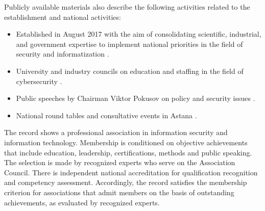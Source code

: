 Publicly available materials also describe the following activities related to the establishment and national activities:

\vspace{-0.5\baselineskip}
\begin{itemize}[nosep]
\item Established in August 2017 with the aim of consolidating scientific, industrial, and government expertise to implement national priorities in the field of security and informatization .
\item University and industry councils on education and staffing in the field of cybersecurity .
\item Public speeches by Chairman Viktor Pokusov on policy and security issues .
\item National round tables and consultative events in Astana .
\end{itemize}

The record shows a professional association in information security and information technology. Membership is conditioned on objective achievements that include education, leadership, certifications, methods and public speaking. The selection is made by recognized experts who serve on the Association Council. There is independent national accreditation for qualification recognition and competency assessment. Accordingly, the record satisfies the membership criterion for associations that admit members on the basis of outstanding achievements, as evaluated by recognized experts.

